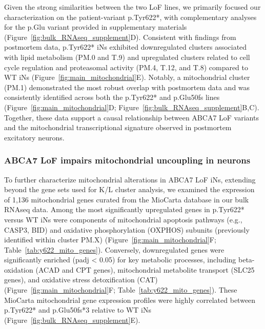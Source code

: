 Given the strong similarities between the two LoF lines, we primarily focused our characterization on the patient-variant p.Tyr622*, with complementary analyses for the p.Glu variant provided in supplementary materials (Figure~\ref{fig:bulk_RNAseq_supplement}D). Consistent with findings from postmortem data, p.Tyr622* iNs exhibited downregulated clusters associated with lipid metabolism (PM.0 and T.9) and upregulated clusters related to cell cycle regulation and proteasomal activity (PM.4, T.12, and T.8) compared to WT iNs (Figure~\ref{fig:main_mitochondrial}E). Notably, a mitochondrial cluster (PM.1) demonstrated the most robust overlap with postmortem data and was consistently identified across both the p.Tyr622* and p.Glu50fs lines (Figure~\ref{fig:main_mitochondrial}D; Figure~\ref{fig:bulk_RNAseq_supplement}B,C). Together, these data support a causal relationship between ABCA7 LoF variants and the mitochondrial transcriptional signature observed in postmortem excitatory neurons.

\subsubsection{ABCA7 LoF impairs mitochondrial uncoupling in neurons}
To further characterize mitochondrial alterations in ABCA7 LoF iNs, extending beyond the gene sets used for K/L cluster analysis, we examined the expression of 1,136 mitochondrial genes curated from the MioCarta database in our bulk RNAseq data. Among the most significantly upregulated genes in p.Tyr622* versus WT iNs were components of mitochondrial apoptosis pathways (e.g., CASP3, BID) and oxidative phosphorylation (OXPHOS) subunits (previously identified within cluster PM.X) (Figure~\ref{fig:main_mitochondrial}F; Table~\ref{tab:y622_mito_genes}). Conversely, downregulated genes were significantly enriched (padj < 0.05) for key metabolic processes, including beta-oxidation (ACAD and CPT genes), mitochondrial metabolite transport (SLC25 genes), and oxidative stress detoxification (CAT) (Figure~\ref{fig:main_mitochondrial}F; Table~\ref{tab:y622_mito_genes}). These MioCarta mitochondrial gene expression profiles were highly correlated between p.Tyr622* and p.Glu50fs*3 relative to WT iNs (Figure~\ref{fig:bulk_RNAseq_supplement}E).

